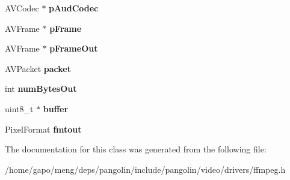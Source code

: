 \begin{DoxyCompactItemize}
\item 
A\+V\+Codec $\ast$ {\bfseries p\+Aud\+Codec}\hypertarget{classpangolin_1_1_ffmpeg_video_ac5e55f322a785ec3bec63f3526d2a29d}{}\label{classpangolin_1_1_ffmpeg_video_ac5e55f322a785ec3bec63f3526d2a29d}

\item 
A\+V\+Frame $\ast$ {\bfseries p\+Frame}\hypertarget{classpangolin_1_1_ffmpeg_video_afcaf4367e2165016cba0bc6d53885f67}{}\label{classpangolin_1_1_ffmpeg_video_afcaf4367e2165016cba0bc6d53885f67}

\item 
A\+V\+Frame $\ast$ {\bfseries p\+Frame\+Out}\hypertarget{classpangolin_1_1_ffmpeg_video_afd159be76fca1627679e33241c0983e4}{}\label{classpangolin_1_1_ffmpeg_video_afd159be76fca1627679e33241c0983e4}

\item 
A\+V\+Packet {\bfseries packet}\hypertarget{classpangolin_1_1_ffmpeg_video_aeea5ad8a8a8028895d4690bd68c3248f}{}\label{classpangolin_1_1_ffmpeg_video_aeea5ad8a8a8028895d4690bd68c3248f}

\item 
int {\bfseries num\+Bytes\+Out}\hypertarget{classpangolin_1_1_ffmpeg_video_a52c23d3a5bb360cf82dd4e715d5712ad}{}\label{classpangolin_1_1_ffmpeg_video_a52c23d3a5bb360cf82dd4e715d5712ad}

\item 
uint8\+\_\+t $\ast$ {\bfseries buffer}\hypertarget{classpangolin_1_1_ffmpeg_video_a2479d68835213b014cefc60158b2e77a}{}\label{classpangolin_1_1_ffmpeg_video_a2479d68835213b014cefc60158b2e77a}

\item 
Pixel\+Format {\bfseries fmtout}\hypertarget{classpangolin_1_1_ffmpeg_video_aae8ae4a5e6b6635b1da6a6e361dd5b1c}{}\label{classpangolin_1_1_ffmpeg_video_aae8ae4a5e6b6635b1da6a6e361dd5b1c}

\end{DoxyCompactItemize}


The documentation for this class was generated from the following file\+:\begin{DoxyCompactItemize}
\item 
/home/gapo/meng/deps/pangolin/include/pangolin/video/drivers/ffmpeg.\+h\end{DoxyCompactItemize}
